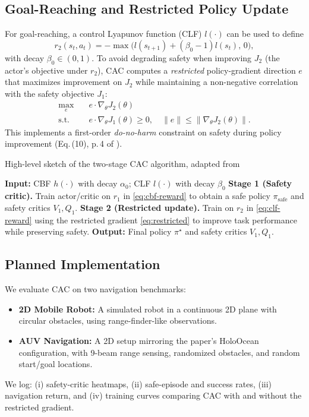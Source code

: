 \documentclass[10pt,conference]{IEEEtran}
\begin{document}
\subsection{Goal-Reaching and Restricted Policy Update}
For goal-reaching, a control Lyapunov function (CLF) $l(\cdot)$ can be used to define
\begin{equation}
r_2(s_t,a_t)=-\max\big(l(s_{t+1})+(\beta_0-1)l(s_t),\,0\big),
\label{eq:clf-reward}
\end{equation}
with decay $\beta_0\in(0,1)$. To avoid degrading safety when improving $J_2$ (the actor’s objective under $r_2$), CAC computes a \emph{restricted} policy-gradient direction $e$ that maximizes improvement on $J_2$ while maintaining a non-negative correlation with the safety objective $J_1$:
\begin{align}
\max_{e} \quad & e\cdot\nabla_\theta J_2(\theta) \nonumber\\
\text{s.t.}\quad & e\cdot\nabla_\theta J_1(\theta)\ge 0, \quad \|e\| \le \|\nabla_\theta J_2(\theta)\|.
\label{eq:restricted}
\end{align}
This implements a first-order \emph{do-no-harm} constraint on safety during policy improvement (Eq.\,(10), p.\,4 of \cite{Xie2025CAC}).

\begin{algorithm}[t]
\caption{High-level sketch of the two-stage CAC algorithm, adapted from \cite{Xie2025CAC}}
\begin{algorithmic}[1]
\State \textbf{Input:} CBF $h(\cdot)$ with decay $\alpha_0$; CLF $l(\cdot)$ with decay $\beta_0$
\State \textbf{Stage 1 (Safety critic).} Train actor/critic on $r_1$ in \eqref{eq:cbf-reward} to obtain a safe policy $\pi_{\text{safe}}$ and safety critics $V_1, Q_1$.
\State \textbf{Stage 2 (Restricted update).} Train on $r_2$ in \eqref{eq:clf-reward} using the restricted gradient \eqref{eq:restricted} to improve task performance while preserving safety.
\State \textbf{Output:} Final policy $\pi^\star$ and safety critics $V_1, Q_1$.
\end{algorithmic}
\end{algorithm}

\subsection{Planned Implementation}
We evaluate CAC on two navigation benchmarks:
\begin{itemize}
    \item \textbf{2D Mobile Robot:} A simulated robot in a continuous 2D plane with circular obstacles, using range-finder-like observations.
    \item \textbf{AUV Navigation:} A 2D setup mirroring the paper’s HoloOcean configuration, with 9-beam range sensing, randomized obstacles, and random start/goal locations.
\end{itemize}
We log: (i) safety-critic heatmaps, (ii) safe-episode and success rates, (iii) navigation return, and (iv) training curves comparing CAC with and without the restricted gradient.
\end{document}
